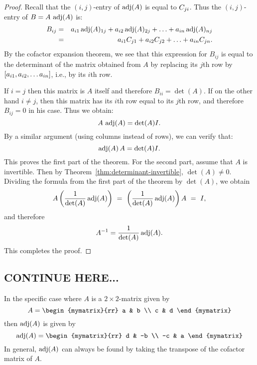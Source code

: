 \begin{proof}
  Recall that the $(i,j)$-entry of $\adj(A)$ is equal to
  $\cofactor{A}{ji}$.  Thus the $(i,j)$-entry of $B=A\,\adj(A)$ is:
  \begin{eqnarray*}
    B_{ij}
    &=& a_{i1}\adj(A)_{1j} + a_{i2}\adj(A)_{2j} + \ldots + a_{in}\adj(A)_{nj} \\
    &=& a_{i1}\cofactor{A}{j1} + a_{i2}\cofactor{A}{j2} + \ldots + a_{in}\cofactor{A}{jn}.
  \end{eqnarray*}
  By the cofactor expansion theorem, we see that this expression for
  $B_{ij}$ is equal to the determinant of the matrix obtained from $A$
  by replacing its $j$th row by $\mat{a_{i1}, a_{i2}, \dots a_{in}}$, 
  i.e., by its $i$th row.

  If $i=j$ then this matrix is $A$ itself and therefore
  $B_{ii}=\det(A)$. If on the other hand $i\neq j$, then this matrix
  has its $i$th row equal to its $j$th row, and therefore $B_{ij}=0$
  in his case. Thus we obtain:
  \begin{equation*}
    A \, \adj(A) = {\det(A)} I.
  \end{equation*}
  By a similar argument (using columns instead of rows), we can verify that:
  \begin{equation*}
    \adj(A)\,A = {\det(A)} I.
  \end{equation*}
  This proves the first part of the theorem. For the second part,
  assume that $A$ is invertible. Then by
  Theorem~\ref{thm:determinant-invertible}, $\det(A)\neq 0$. Dividing the
  formula from the first part of the theorem by $\det(A)$, we obtain
  \begin{equation*}
    A\paren{\frac{1}{\det(A)}\adj(A)} ~=~ \paren{\frac{1}{\det(A)}\adj(A)}A ~=~ I,
  \end{equation*}
  and therefore 
  \begin{equation*}
    A^{-1} = \frac{1}{\det(A)} \adj(A).
  \end{equation*}
  This completes the proof.
\end{proof}


\subsection{CONTINUE HERE...}

In the specific case where $A$ is a $2 \times 2$-matrix given by
\begin{equation*}
  A = \begin{mymatrix}{rr}
    a & b \\
    c & d
  \end{mymatrix}
\end{equation*}
then $\adj(A)$ is given by
\begin{equation*}
  \adj(A) = 
  \begin{mymatrix}{rr}
    d & -b \\
    -c & a
  \end{mymatrix}
\end{equation*}
In general, $\adj(A)$ can always be found by taking the
transpose of the cofactor matrix of $A$. 

